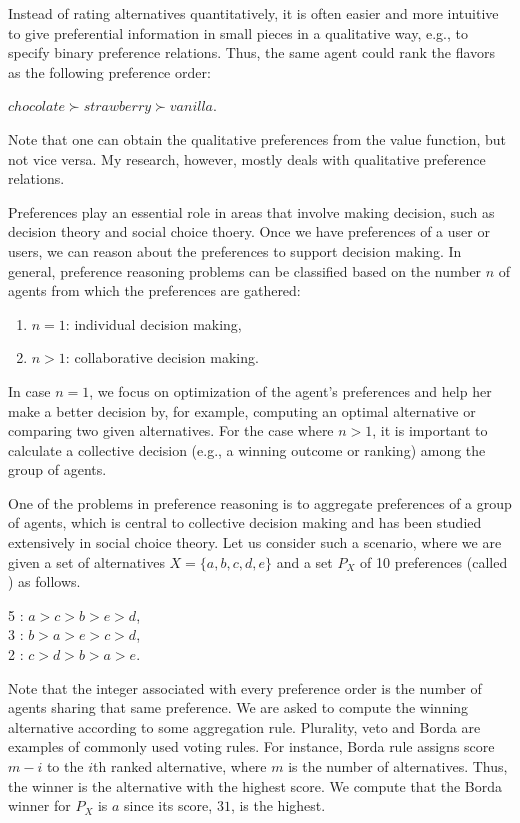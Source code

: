 Instead of rating alternatives quantitatively, it is
often easier and more intuitive to give preferential information
in small pieces in a qualitative way,
e.g., to specify binary preference relations.
Thus, the same agent could rank the flavors as the following
preference order:
\begin{center}
	$chocolate \succ strawberry \succ vanilla$.
\end{center}
Note that one can obtain the qualitative preferences from
the value function, but not vice versa.
My research, however, mostly deals with qualitative preference relations.

Preferences play an essential role in areas that involve making
decision, such as decision theory and social choice thoery.
Once we have preferences of a user or users, we can reason about
the preferences to support decision making.
In general, preference reasoning problems can be classified
based on the number $n$ of agents from which the preferences are gathered:
\begin{enumerate} \itemsep -4pt
	\item $n=1$: individual decision making,
	\item $n>1$: collaborative decision making.
\end{enumerate}
In case $n=1$, we focus on optimization of the agent's preferences and
help her make a better decision by, for example, computing an optimal
alternative or comparing two given alternatives.  For the case
where $n>1$, it is important to calculate
a collective decision (e.g., a winning outcome or ranking)
among the group of agents.

One of the problems in preference reasoning is to
aggregate preferences of a group of
agents, which is central to collective decision making and has been studied
extensively in social choice theory. 
Let us consider such a scenario, where we are
given a set of alternatives $X = \{ a,b,c,d,e \}$ and a set $P_X$ of 10 
preferences (called ) as follows.
	\begin{center}
		5 : $a > c > b > e > d$,\\
		3 : $b > a > e > c > d$,\\
		2 : $c > d > b > a > e$.
	\end{center}
	
Note that the integer associated with every preference order
is the number of agents sharing that same preference.
We are asked to compute the winning alternative according to some aggregation rule. 
Plurality, veto and Borda are examples of commonly used voting rules.
For instance, Borda rule assigns score $m-i$ to the $i$th ranked 
alternative, where $m$ is the number of alternatives.
Thus, the winner is the alternative with the highest score.
We compute that the Borda winner for $P_X$ is $a$ since its 
score, $31$, is the highest.

